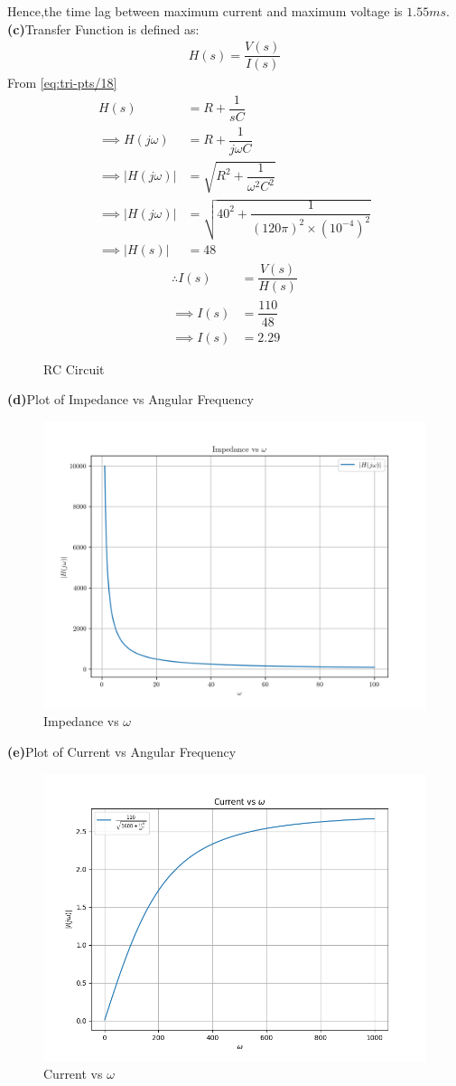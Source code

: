\documentclass[journal,12pt,twocolumn]{IEEEtran}
\theoremstyle{remark}
\begin{document}
Hence,the time lag between maximum current and maximum voltage is $1.55ms$.\\
\linebreak 
\textbf{(c)}Transfer Function is defined as:
\begin{align}
\label{eq:tri-pts/18} H(s)=\dfrac{V(s)}{I(s)}
\end{align}
From \eqref{eq:tri-pts/18}\\
\begin{align}
\label{eq:tri-pts/19}
  H(s)&=R+\dfrac{1}{sC}\\
\label{eq:tri-pts/20}\implies H(j \omega)
&=R+\dfrac{1}{j \omega C}\\
\label{eq:tri-pts/21}\implies |H(j \omega)| &= \sqrt{R^2 + \dfrac{1}{\omega^2 C^2}}\\
\label{eq:tri-pts/22}\implies |H(j \omega)|&=\sqrt{40^2 + \dfrac{1}{{(120\pi)^2 \times (10^{-4})^2}}}\\
\label{eq:tri-pts/23}\implies |H(s)|&=48
\end{align}
\begin{align}
\label{eq:tri-pts/24} \therefore I(s)&=\dfrac{V(s)}{H(s)}\\
\label{eq:tri-pts/25}
\implies I(s)&=\dfrac{110}{48}\\
\label{eq:tri-pts/26}
\implies I(s)&=2.29
\end{align}

\vspace{10cm}

\begin{figure}[!h]
	\centering
	
	\caption{RC Circuit}
	\label{fig:2}
\end{figure}

\textbf{(d)}Plot of Impedance vs Angular Frequency

\begin{figure}[h]
    \centering
    \includegraphics[width = 2.4 in, height = 1.6 in]{figs/fig3.png}
    \caption{Impedance vs $\omega$}
    \label{fig:h_plot}
\end{figure}

\textbf{(e)}Plot of Current vs Angular Frequency

\begin{figure}[h]
    \centering
    \includegraphics[width = 2.4 in, height = 1.6 in]{figs/fig4.png}
    \caption{Current vs $\omega$}
    \label{fig:h_plot}
\end{figure}
\end{document}
